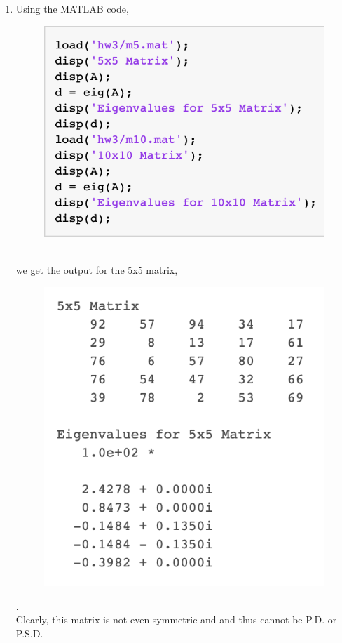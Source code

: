 \documentclass[a4paper,11pt]{article}
\begin{document}
{{\begin{enumerate}[leftmargin=*]
		\item Using the MATLAB code,
			\begin{figure}[h!]
				\includegraphics[width=\linewidth]{code.png}
			\end{figure}\\
			we get the output for the 5x5 matrix,
			\pagebreak
			\begin{figure}[h!]
				\includegraphics[width=\linewidth]{5.png}
			\end{figure}.\\
			Clearly, this matrix is not even symmetric and and thus cannot be P.D. or P.S.D.


\end{enumerate}}}
\end{document}
